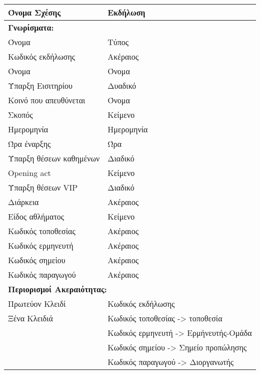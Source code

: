 \begin{tabular}{|p{6cm}|p{8cm}|}
  \hline
  Όνομα Σχέσης            & Εκδήλωση                              \\ \hline
  \multicolumn{2}{|l|}{\textbf{Γνωρίσματα:}}                      \\ \hline
  Όνομα                   & Τύπος                                 \\ \hline
  Κωδικός εκδήλωσης       & Ακέραιος                              \\ \hline
  Όνομα                   & Όνομα                                 \\ \hline
  Ύπαρξη Εισιτηρίου       & Δυαδικό                               \\ \hline
  Κοινό που απευθύνεται   & Όνομα                                 \\ \hline
  Σκοπός                  & Κείμενο                               \\ \hline
  Ημερομηνία              & Ημερομηνία                            \\ \hline
  Ώρα έναρξης             & Ώρα                                   \\ \hline
  Ύπαρξη θέσεων καθημένων & Διαδικό                               \\ \hline
  Opening act             & Κείμενο                               \\ \hline
  Ύπαρξη θέσεων VIP       & Διαδικό                               \\ \hline
  Διάρκεια                & Ακέραιος                              \\ \hline
  Είδος αθλήματος         & Κείμενο                               \\ \hline
  Κωδικός τοποθεσίας      & Ακέραιος                              \\ \hline
  Κωδικός ερμηνευτή       & Ακέραιος                              \\ \hline
  Κωδικός σημείου         & Ακέραιος                              \\ \hline
  Κωδικός παραγωγού       & Ακέραιος                              \\ \hline
  \multicolumn{2}{|l|}{\textbf{Περιορισμοί Ακεραιότητας:}}        \\ \hline
  Πρωτεύον Κλειδί         & Κωδικός εκδήλωσης                     \\ \hline
  Ξένα Κλειδιά            & Κωδικός τοποθεσίας -> τοποθεσία       \\ \cline{2-2}
                          & Κωδικός ερμηνευτή -> Ερμήνευτής-Ομάδα \\ \cline{2-2}
                          & Κωδικός σημείου -> Σημείο προπώλησης  \\ \cline{2-2}
                          & Κωδικός παραγωγού -> Διοργανωτής      \\ \hline
\end{tabular}


